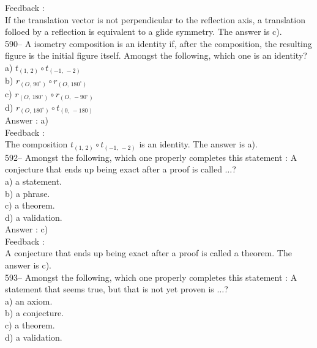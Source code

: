 \documentclass[letterpaper, 12pt]{article}
\begin{document}
Feedback : \\
If the translation vector is not perpendicular to the reflection axis, a translation folloed by a reflection is equivalent to a glide symmetry. The answer is c).\\

590-- A isometry composition is an identity if, after the composition, the resulting figure is the initial figure itself. Amongst the following, which one is an identity?\\
a) $t_{\left(1,\,2\right) } \circ t_{\left(-1,\,-2\right) } $\\
b) $r_{\left(O,\,90^{\circ}\right)} \circ r_{\left(O,\,180^{\circ}\right)}
$\\
c) $r_{\left(O,\,180^{\circ}\right)} \circ r_{\left(O,\,-90^{\circ}\right)}
$\\
d) $r_{\left(O,\,180^{\circ}\right)} \circ t_{\left(0,\,-180\right)} $   \\

Answer : a) \\

Feedback : \\
The composition $t_{\left(1,\,2\right) } \circ t_{\left(-1,\,-2\right) } $ is an identity.  The answer is a).\\


592--  Amongst the following, which one properly completes this statement : \og A conjecture that ends up being exact after a proof is called $\dots$\fg ?\\
a) a statement.\\
b) a phrase. \\
c) a theorem.\\
d) a validation.\\

Answer : c)\\

Feedback : \\
A conjecture that ends up being exact after a proof is called a theorem.  The answer is c).\\

593-- Amongst the following, which one properly completes this statement : \og A statement that seems true, but that is not yet proven is $\ldots$\fg ?\\
a) an axiom.\\
b) a conjecture.\\
c) a theorem.\\
d) a validation.\\
\end{document}
